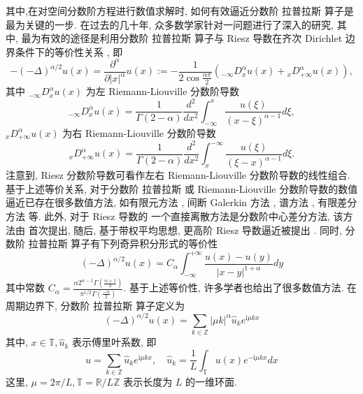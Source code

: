 其中,在对空间分数阶方程进行数值求解时, 如何有效逼近分数阶 拉普拉斯 算子是最为关键的一步. 
在过去的几十年, 众多数学家针对一问题进行了深入的研究, 其中, 最为有效的途径是利用分数阶 拉普拉斯 算子与 Riesz 导数在齐次 Dirichlet 边界条件下的等价性关系 \cite{yangNumericalMethodsFractional2010,demengelFunctionalSpacesTheory2012}, 即
\begin{equation}
-(-\Delta)^{\alpha / 2} u(x)=\frac{\partial^\alpha}{\partial|x|^\alpha} u(x):=-\frac{1}{2 \cos \frac{\alpha \pi}{2}}\left({ }_{-\infty }D_x^\alpha u(x)+{ }_x D_{+\infty}^\alpha u(x)\right),
\end{equation}
其中 ${ }_{-\infty} D_x^\alpha u(x)$ 为左 Riemann-Liouville 分数阶导数
\begin{equation}
{ }_{-\infty} D_x^\alpha u(x)=\frac{1}{\Gamma(2-\alpha)} \frac{d^2}{d x^2} \int_{-\infty}^x \frac{u(\xi)}{(x-\xi)^{\alpha-1}} d \xi,
\end{equation}
${ }_x D_{+\infty}^\alpha u(x)$ 为右 Riemann-Liouville 分数阶导数
\begin{equation}
{ }_x D_{+\infty}^\alpha u(x)=\frac{1}{\Gamma(2-\alpha)} \frac{d^2}{d x^2} \int^{-\infty}_x \frac{u(\xi)}{(\xi-x)^{\alpha-1}} d \xi .
\end{equation}
注意到, Riesz 分数阶导数可看作左右 Riemann-Liouville 分数阶导数的线性组合.
基于上述等价关系, 对于分数阶 拉普拉斯 或 Riemann-Liouville 分数阶导数的数值逼近已存在很多数值方法, 如有限元方法 \cite{dengFiniteElementMethod2009,ervinNumericalApproximationTime2007}, 间断 Galerkin 方法 \cite{xuDiscontinuousGalerkinMethod2014}, 谱方法 \cite{zayernouriFractionalSpectralCollocation2014,zengCrankNicolsonADI2014}, 有限差分方法 \cite{chenFourthOrderAccurate2014,meerschaertFiniteDifferenceApproximations2004} 等. 
此外, 对于 Riesz 导数的 一个直接离散方法是分数阶中心差分方法, 该方法由 \cite{duAnalysisApproximationNonlocal2012} 首次提出, 随后, 基于带权平均思想, 更高阶 Riesz 导数逼近被提出 \cite{dingHighorderAlgorithmsRiesz2015,zhangFourthOrderCompactDifference2014}.
同时, 分数阶 拉普拉斯 算子有下列奇异积分形式的等价性 \cite{duAnalysisApproximationNonlocal2012}
\begin{equation}
(-\Delta)^{\alpha / 2} u(x)=C_\alpha \int_{-\infty}^{+\infty} \frac{u(x)-u(y)}{|x-y|^{1+\alpha}} d y
\end{equation}
其中常数 $C_\alpha=\frac{\alpha 2^{\alpha-1} \Gamma\left(\frac{\alpha+1}{2}\right)}{\pi^{1 / 2} \Gamma\left(\frac{-\alpha}{2}\right)}$. 基于上述等价性, 许多学者也给出了很多数值方法\cite{gaoMeanExitTime2014,huangNumericalMethodsFractional2014}. 在周期边界下, 分数阶 拉普拉斯 算子定义为 \cite{guoFractionalPartialDifferential2015}
\begin{equation}
(-\Delta)^{\alpha / 2} u(x)=\sum_{k \in \mathbb{Z}}|\mu k|^\alpha \hat{u}_k e^{\mathrm{i} \mu k x}
\end{equation}
其中, $x \in \mathbb{T}, \hat{u}_k$ 表示傅里叶系数, 即
\begin{equation}
u=\sum_{k \in \mathbb{Z}} \hat{u}_k e^{\mathrm{i} \mu k x}, \quad \hat{u}_k=\frac{1}{L} \int_{\mathbb{T}} u(x) e^{-\mathrm{i} \mu k x} d x
\end{equation}
这里, $\mu=2 \pi / L, \mathbb{T}=\mathbb{R} / L \mathbb{Z}$ 表示长度为 $L$ 的一维环面.


